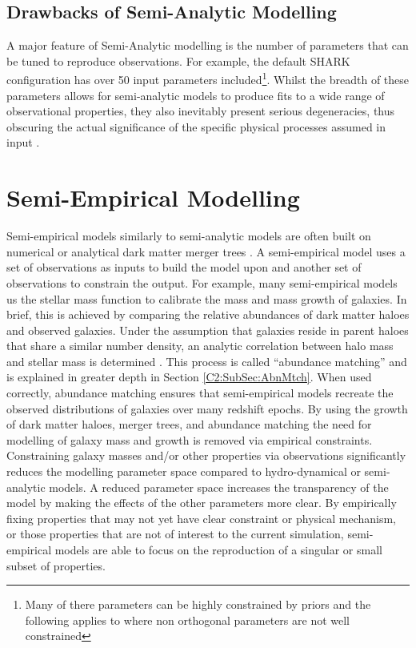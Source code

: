 \subsection{Drawbacks of Semi-Analytic Modelling}
A major feature of Semi-Analytic modelling is the number of parameters that can be tuned to reproduce observations. For example, the default SHARK configuration has over 50 input parameters included\footnote{Many of there parameters can be highly constrained by priors and the following applies to where non orthogonal parameters are not well constrained}. Whilst the breadth of these parameters allows for semi-analytic models to produce fits to a wide range of observational properties, they also inevitably present serious degeneracies, thus obscuring the actual significance of the specific physical processes assumed in input \citep{Lapi2011DarkModels,Gonzalez2011Evolution4}.


\section{Semi-Empirical Modelling}
\label{sec:SEM}
Semi-empirical models similarly to semi-analytic models are often built on numerical or analytical dark matter merger trees \cite{Zavala2012}. A semi-empirical model uses a set of observations as inputs to build the model upon and another set of observations to constrain the output. 
For example, many semi-empirical models us the stellar mass function to calibrate the mass and mass growth of galaxies. In brief, this is achieved by comparing the relative abundances of dark matter haloes and observed galaxies. Under the assumption that galaxies reside in parent haloes that share a similar number density, an analytic correlation between halo mass and stellar mass is determined \citep{Kravtsov2004TheDistribution,Shankar2006NewFormation}. This process is called ``abundance matching'' and is explained in greater depth in Section \ref{C2:SubSec:AbnMtch}. When used correctly, abundance matching ensures that semi-empirical models recreate the observed distributions of galaxies over many redshift epochs. By using the growth of dark matter haloes, merger trees, and abundance matching the need for modelling of galaxy mass and growth is removed via empirical constraints. Constraining galaxy masses and/or other properties via observations significantly reduces the modelling parameter space compared to hydro-dynamical or semi-analytic models. A reduced parameter space increases the transparency of the model by making the effects of the other parameters more clear. By empirically fixing properties that may not yet have clear constraint or physical mechanism, or those properties that are not of interest to the current simulation, semi-empirical models are able to focus on the reproduction of a singular or small subset of properties.

